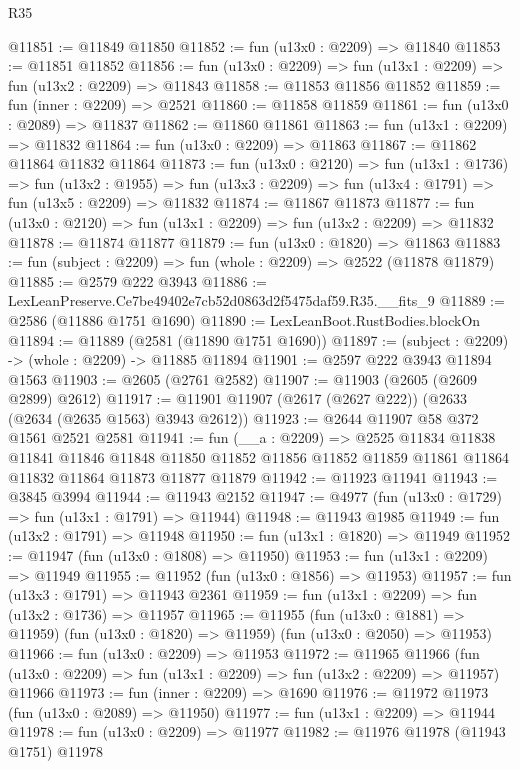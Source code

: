 \begin{lexlean}{R35}
\begin{coremodule}
@11851 := @11849 @11850
@11852 := fun (u13x0 : @2209) => @11840
@11853 := @11851 @11852
@11856 := fun (u13x0 : @2209) => fun (u13x1 : @2209) => fun (u13x2 : @2209) => @11843
@11858 := @11853 @11856 @11852
@11859 := fun (inner : @2209) => @2521
@11860 := @11858 @11859
@11861 := fun (u13x0 : @2089) => @11837
@11862 := @11860 @11861
@11863 := fun (u13x1 : @2209) => @11832
@11864 := fun (u13x0 : @2209) => @11863
@11867 := @11862 @11864 @11832 @11864
@11873 := fun (u13x0 : @2120) =>
  fun (u13x1 : @1736) =>
  fun (u13x2 : @1955) => fun (u13x3 : @2209) => fun (u13x4 : @1791) => fun (u13x5 : @2209) => @11832
@11874 := @11867 @11873
@11877 := fun (u13x0 : @2120) => fun (u13x1 : @2209) => fun (u13x2 : @2209) => @11832
@11878 := @11874 @11877
@11879 := fun (u13x0 : @1820) => @11863
@11883 := fun (subject : @2209) => fun (whole : @2209) => @2522 (@11878 @11879)
@11885 := @2579 @222 @3943
@11886 := LexLeanPreserve.Ce7be49402e7cb52d0863d2f5475daf59.R35.__fits_9
@11889 := @2586 (@11886 @1751 @1690)
@11890 := LexLeanBoot.RustBodies.blockOn
@11894 := @11889 (@2581 (@11890 @1751 @1690))
@11897 := (subject : @2209) -> (whole : @2209) -> @11885 @11894
@11901 := @2597 @222 @3943 @11894 @1563
@11903 := @2605 (@2761 @2582)
@11907 := @11903 (@2605 (@2609 @2899) @2612)
@11917 := @11901 @11907 (@2617 (@2627 @222)) (@2633 (@2634 (@2635 @1563) @3943 @2612))
@11923 := @2644 @11907 @58 @372 @1561 @2521 @2581
@11941 := fun (__a : @2209) =>
  @2525
    @11834
    @11838
    @11841
    @11846
    @11848
    @11850
    @11852
    @11856
    @11852
    @11859
    @11861
    @11864
    @11832
    @11864
    @11873
    @11877
    @11879
@11942 := @11923 @11941
@11943 := @3845 @3994
@11944 := @11943 @2152
@11947 := @4977 (fun (u13x0 : @1729) => fun (u13x1 : @1791) => @11944)
@11948 := @11943 @1985
@11949 := fun (u13x2 : @1791) => @11948
@11950 := fun (u13x1 : @1820) => @11949
@11952 := @11947 (fun (u13x0 : @1808) => @11950)
@11953 := fun (u13x1 : @2209) => @11949
@11955 := @11952 (fun (u13x0 : @1856) => @11953)
@11957 := fun (u13x3 : @1791) => @11943 @2361
@11959 := fun (u13x1 : @2209) => fun (u13x2 : @1736) => @11957
@11965 := @11955
    (fun (u13x0 : @1881) => @11959)
    (fun (u13x0 : @1820) => @11959)
    (fun (u13x0 : @2050) => @11953)
@11966 := fun (u13x0 : @2209) => @11953
@11972 := @11965
    @11966
    (fun (u13x0 : @2209) => fun (u13x1 : @2209) => fun (u13x2 : @2209) => @11957)
    @11966
@11973 := fun (inner : @2209) => @1690
@11976 := @11972 @11973 (fun (u13x0 : @2089) => @11950)
@11977 := fun (u13x1 : @2209) => @11944
@11978 := fun (u13x0 : @2209) => @11977
@11982 := @11976 @11978 (@11943 @1751) @11978

\end{coremodule}
\end{lexlean}
